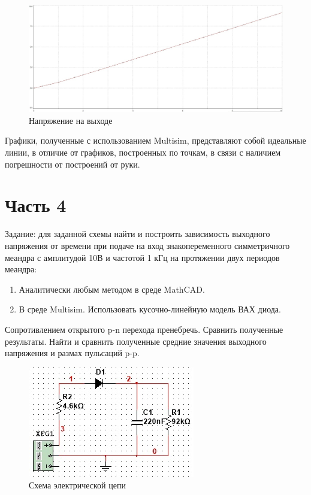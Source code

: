 \documentclass{labreport}
\begin{document}
\begin{figure}[h]
    \centering
    \includegraphics[width=\linewidth]{graph_m_u_o.jpg}
    \caption{Напряжение на выходе}
\end{figure}



Графики, полученные с использованием Multisim, представляют собой идеальные линии, в отличие от графиков, построенных по точкам, в связи с наличием погрешности от построений от руки.


\chapter{Часть 4}
Задание: для заданной схемы найти и построить зависимость выходного напряжения от времени при подаче на вход знакопеременного симметричного меандра с амплитудой 10В и частотой 1 кГц на протяжении двух периодов меандра: 
\begin{enumerate}
    
    \item Аналитически любым методом в среде MathCAD.
    \item В среде Multisim. Использовать кусочно-линейную модель ВАХ диода.
\end{enumerate}

Сопротивлением открытого p-n перехода пренебречь. Сравнить полученные результаты. Найти и сравнить полученные средние значения выходного напряжения и размах пульсаций p-p.

\begin{figure}[h]
    \centering
    \includegraphics{ek_schema3.jpg}
    \caption{Схема электрической цепи}
\end{figure}
\end{document}
